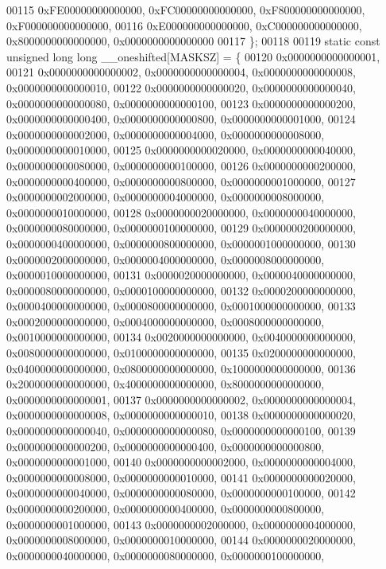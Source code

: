 \begin{DoxyCode}
00115         0xFE00000000000000, 0xFC00000000000000, 0xF800000000000000, 0xF000000000000000,
00116         0xE000000000000000, 0xC000000000000000, 0x8000000000000000, 0x0000000000000000
00117 \};
00118 
00119 \textcolor{keyword}{static} \textcolor{keyword}{const} \textcolor{keywordtype}{unsigned} \textcolor{keywordtype}{long} \textcolor{keywordtype}{long} \_\_oneshifted[MASKSZ] = \{
00120         0x0000000000000001,
00121         0x0000000000000002, 0x0000000000000004, 0x0000000000000008, 0x0000000000000010,
00122         0x0000000000000020, 0x0000000000000040, 0x0000000000000080, 0x0000000000000100,
00123         0x0000000000000200, 0x0000000000000400, 0x0000000000000800, 0x0000000000001000,
00124         0x0000000000002000, 0x0000000000004000, 0x0000000000008000, 0x0000000000010000,
00125         0x0000000000020000, 0x0000000000040000, 0x0000000000080000, 0x0000000000100000,
00126         0x0000000000200000, 0x0000000000400000, 0x0000000000800000, 0x0000000001000000,
00127         0x0000000002000000, 0x0000000004000000, 0x0000000008000000, 0x0000000010000000,
00128         0x0000000020000000, 0x0000000040000000, 0x0000000080000000, 0x0000000100000000,
00129         0x0000000200000000, 0x0000000400000000, 0x0000000800000000, 0x0000001000000000,
00130         0x0000002000000000, 0x0000004000000000, 0x0000008000000000, 0x0000010000000000,
00131         0x0000020000000000, 0x0000040000000000, 0x0000080000000000, 0x0000100000000000,
00132         0x0000200000000000, 0x0000400000000000, 0x0000800000000000, 0x0001000000000000,
00133         0x0002000000000000, 0x0004000000000000, 0x0008000000000000, 0x0010000000000000,
00134         0x0020000000000000, 0x0040000000000000, 0x0080000000000000, 0x0100000000000000,
00135         0x0200000000000000, 0x0400000000000000, 0x0800000000000000, 0x1000000000000000,
00136         0x2000000000000000, 0x4000000000000000, 0x8000000000000000, 0x0000000000000001,
00137         0x0000000000000002, 0x0000000000000004, 0x0000000000000008, 0x0000000000000010,
00138         0x0000000000000020, 0x0000000000000040, 0x0000000000000080, 0x0000000000000100,
00139         0x0000000000000200, 0x0000000000000400, 0x0000000000000800, 0x0000000000001000,
00140         0x0000000000002000, 0x0000000000004000, 0x0000000000008000, 0x0000000000010000,
00141         0x0000000000020000, 0x0000000000040000, 0x0000000000080000, 0x0000000000100000,
00142         0x0000000000200000, 0x0000000000400000, 0x0000000000800000, 0x0000000001000000,
00143         0x0000000002000000, 0x0000000004000000, 0x0000000008000000, 0x0000000010000000,
00144         0x0000000020000000, 0x0000000040000000, 0x0000000080000000, 0x0000000100000000,

\end{DoxyCode}
